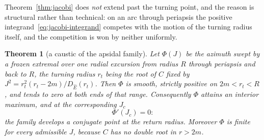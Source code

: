 \documentclass[12pt]{iopart}
\newcommand{\Ehat}{\hat E}
\theoremstyle{plain}
\theoremstyle{definition}
\theoremstyle{plain}
\newtheorem{auxtheorem}[auxlemma]{Theorem}
\theoremstyle{remark}
\begin{document}
Theorem~\ref{thm:jacobi} does \emph{not} extend past the turning point, and the reason is
structural rather than technical: on an arc through periapsis the positive
integrand~\eqref{eq:jacobi-integrand} competes with the motion of the turning radius
itself, and the competition is won by neither uniformly.

\begin{auxtheorem}[a caustic of the apsidal family]\label{thm:caustic}
Let $\Phi(J)$ be the azimuth swept by a frozen extremal over one radial excursion from
radius $R$ through periapsis and back to $R$, the turning radius $r_t$ being the root of
$C$ fixed by $J^2=r_t^2(r_t-2m)/D_{\Ehat}(r_t)$. Then $\Phi$ is smooth, strictly positive
on $2m<r_t<R$, and tends to zero at both ends of that range. Consequently $\Phi$ attains an
interior maximum, and at the corresponding $J_c$
\begin{equation}
   \Phi'(J_c)=0 :
   \label{eq:caustic}
\end{equation}
the family develops a \emph{conjugate point} at the return radius. Moreover $\Phi$ is
finite for every admissible $J$, because $C$ has no double root in $r>2m$.
\end{auxtheorem}
\end{document}
